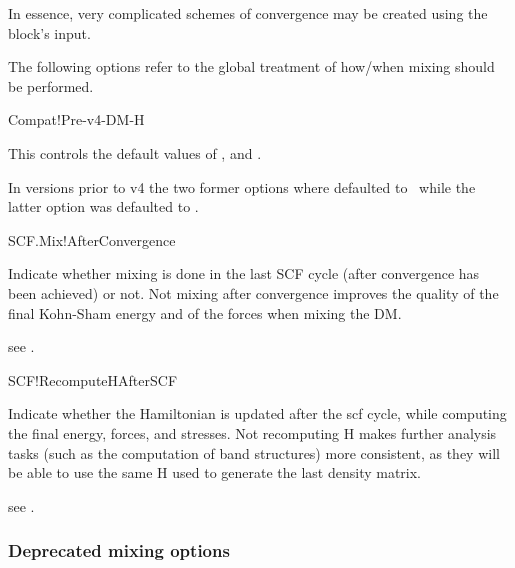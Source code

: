 In essence, very complicated schemes of convergence may be created
using the block's input.

The following options refer to the global treatment of how/when mixing
should be performed.


\begin{fdflogicalF}{Compat!Pre-v4-DM-H}

  This controls the default values of ,
   and .
  
  In versions prior to v4 the two former options where defaulted to
  \fdftrue\ while the latter option was defaulted to \fdffalse.
  
\end{fdflogicalF}

\begin{fdflogicalF}{SCF.Mix!AfterConvergence}

  Indicate whether mixing is done in the last SCF cycle (after
  convergence has been achieved) or not. Not mixing after convergence
  improves the quality of the final Kohn-Sham energy and of the forces
  when mixing the DM.

  \note see .

\end{fdflogicalF}

\begin{fdflogicalF}{SCF!RecomputeHAfterSCF}
  
  Indicate whether the Hamiltonian is updated after the scf cycle,
  while computing the final energy, forces, and stresses. Not
  recomputing H makes further analysis tasks (such as the computation
  of band structures) more consistent, as they will be able to use the
  same H used to generate the last density matrix.
  
  \note see .

\end{fdflogicalF}


\ifdeprecated
\subsubsection{Deprecated mixing options}

